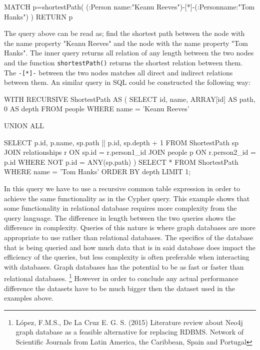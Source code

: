\begin{sqlCode}
MATCH p=shortestPath(
(:Person {name:"Keanu Reeves"})-[*]-(:Person{name:"Tom Hanks"})
) RETURN p
\end{sqlCode}

The query above can be read as; find the shortest path between the node with the name property "Keanu Reeves" and the node with the name property "Tom Hanks". The inner query returns all relation of any length between the two nodes and the function \texttt{shortestPath()} returns the shortest relation between them. The \texttt{-[*]-} between the two nodes matches all direct and indirect relations between them. An similar query in SQL could be constructed the following way:
\begin{sqlCode}
WITH RECURSIVE ShortestPath AS (
SELECT
  id,
  name,
  ARRAY[id] AS path,
  0 AS depth
FROM
  people
WHERE
  name = 'Keanu Reeves'

UNION ALL

SELECT
  p.id,
  p.name,
  sp.path || p.id,
  sp.depth + 1
FROM
  ShortestPath sp
JOIN
  relationships r ON sp.id = r.person1_id
JOIN
  people p ON r.person2_id = p.id
WHERE
  NOT p.id = ANY(sp.path)
  )
SELECT *
FROM ShortestPath
WHERE name = 'Tom Hanks'
ORDER BY depth
LIMIT 1;

\end{sqlCode}
In this query we have to use a recursive common table expression in order to achieve the same functionality as in the Cypher query. This example shows that some functionality in relational database requires more complexity from the query language. The difference in length between the two queries shows the difference in complexity. Queries of this nature is where graph databases are more appropriate to use rather than relational databases. The specifics of the database that is being queried and how much data that is in said database does impact the efficiency of the queries, but less complexity is often preferable when interacting with databases. Graph databases has the potential to be as fast or faster than relational databases. \footnote{López, F.M.S., De La Cruz
E. G. S. (2015) Literature review about Neo4j graph database
as a feasible alternative for replacing RDBMS. Network of Scientific Journals from Latin America, the Caribbean, Spain and Portugal} However in order to conclude any actual performance difference the datasets have to be much bigger then the dataset used in the examples above.



